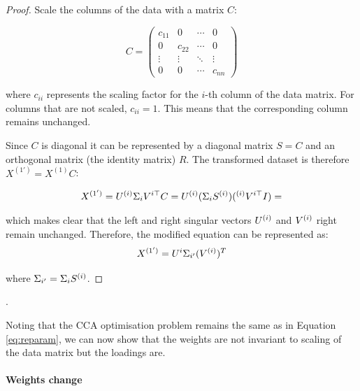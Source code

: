 \begin{proof}
    Scale the columns of the data with a matrix \( C \):

    \begin{equation}
        C = \begin{pmatrix}
                c_{11} & 0      & \cdots & 0      \\
                0      & c_{22} & \cdots & 0      \\
                \vdots & \vdots & \ddots & \vdots \\
                0      & 0      & \cdots & c_{nn}
        \end{pmatrix}
    \end{equation}

    where \( c_{ii} \) represents the scaling factor for the \( i \)-th column of the data matrix. For columns that are not scaled, \( c_{ii} = 1 \).
    This means that the corresponding column remains unchanged.

    Since $C$ is diagonal it can be represented by a diagonal matrix $S=C$ and an orthogonal matrix (the identity matrix) $R$.
    The transformed dataset is therefore \( X^{(1')} = X^{(1)}C \):

    \begin{align}
        X^{(1')} = U^{(i)}\Sigma_{i}V^{i\top}C = U^{(i)}(\Sigma_{i} S^{(i)}) (^{(i)}V^{i\top}I) =  \label{eq:scaled_data}
    \end{align}

    which makes clear that the left and right singular vectors \( U^{(i)} \) and \( V^{(i)} \) right remain unchanged.
    Therefore, the modified equation can be represented as:
    \begin{equation}
        X^{(1')} = U^i \Sigma_{i'} (V^{(i)})^T \label{eq:modified_svd}
    \end{equation}

    where $\Sigma_{i'}=\Sigma_{i} S^{(i)}$.
\end{proof}.

Noting that the CCA optimisation problem remains the same as in Equation \ref{eq:reparam},
we can now show that the weights are not invariant to scaling of the data matrix but the \gls{loadings} are.

\paragraph{Weights change}

